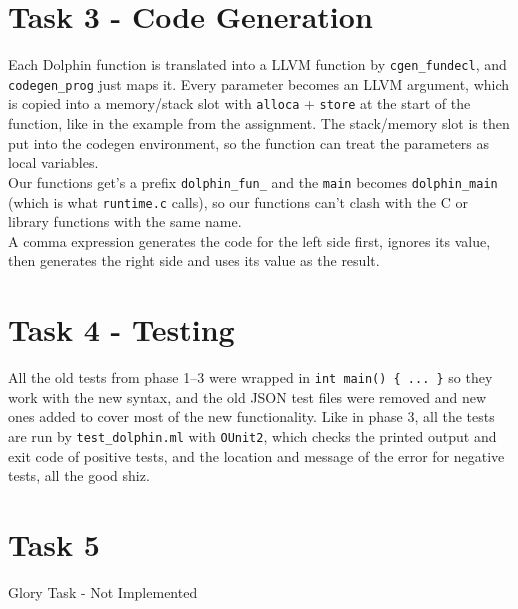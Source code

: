 \documentclass[12pt]{article}
\begin{document}
\section*{Task 3 - Code Generation}
Each Dolphin function is translated into a LLVM function by \texttt{cgen\_fundecl}, and \texttt{codegen\_prog} just maps it. Every parameter becomes an LLVM argument, which is copied into a memory/stack slot with \texttt{alloca} + \texttt{store} at the start of the function, like in the example from the assignment. The stack/memory slot is then put into the codegen environment, so the function can treat the parameters as local variables.\\
\newline
Our functions get's a prefix \texttt{dolphin\_fun\_} and the \texttt{main} becomes \texttt{dolphin\_main} (which is what \texttt{runtime.c} calls), so our functions can't clash with  the C or library functions with the same name.\\
\newline
A comma expression generates the code for the left side first, ignores its value, then generates the right side and uses its value as the result.

\section*{Task 4 - Testing}
All the old tests from phase 1--3 were wrapped in \texttt{int main() \{ ... \}} so they work with the new syntax, and the old JSON test files were removed and new ones added to cover most of the new functionality.
\newline
Like in phase 3, all the tests are run by \texttt{test\_dolphin.ml} with \texttt{OUnit2}, which checks the printed output and exit code of positive tests, and the location and message of the error for negative tests,
all the good shiz.
\section*{Task 5}
Glory Task - Not Implemented
\end{document}
